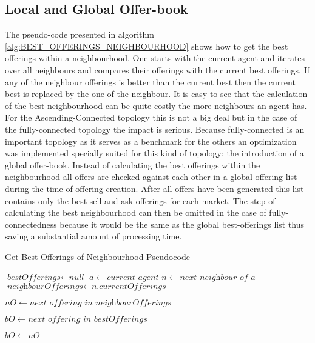 \documentclass[Bachelorarbeit.tex]{subfiles}
\begin{document}
\subsection{Local and Global Offer-book}
The pseudo-code presented in algorithm \ref{alg:BEST_OFFERINGS_NEIGHBOURHOOD} shows how to get the best offerings within a neighbourhood. One starts with the current agent and iterates over all neighbours and compares their offerings with the current best offerings. If any of the neighbour offerings is better than the current best then the current best is replaced by the one of the neighbour. It is easy to see that the calculation of the best neighbourhood can be quite costly the more neighbours an agent has. For the Ascending-Connected topology this is not a big deal but in the case of the fully-connected topology the impact is serious. Because fully-connected is an important topology as it serves as a benchmark for the others an optimization was implemented specially suited for this kind of topology: the introduction of a global offer-book. Instead of calculating the best offerings within the neighbourhood all offers are checked against each other in a global offering-list during the time of offering-creation. After all offers have been generated this list contains only the best sell and ask offerings for each market. The step of calculating the best neighbourhood can then be omitted in the case of fully-connectedness because it would be the same as the global best-offerings list thus saving a substantial amount of processing time.

\begin{algorithm}
\caption{Get Best Offerings of Neighbourhood Pseudocode}
\label{alg:BEST_OFFERINGS_NEIGHBOURHOOD}
\begin{algorithmic}[1]
\State $\textit{bestOfferings} \gets \textit{null}$
\State $a \gets \textit{current agent}$
	\State $n \gets \textit{next neighbour of a}$
	\State $\textit{neighbourOfferings} \gets \textit{n.currentOfferings}$
	
		\State $nO \gets \textit{next offering in neighbourOfferings}$
		
			\State $bO \gets \textit{next offering in bestOfferings}$
		
				\State $bO \gets nO$
			\EndIf
		\EndFor
	\EndFor
\EndFor
\end{algorithmic}
\end{algorithm}
\end{document}
